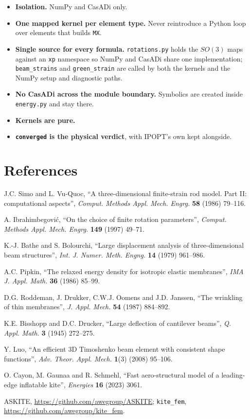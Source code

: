 \documentclass[11pt,a4paper]{article}
\newcommand{\code}[1]{\texttt{\small #1}}
\begin{document}
\begin{itemize}
\item \textbf{Isolation.} NumPy and CasADi only.
\item \textbf{One mapped kernel per element type.} Never reintroduce a Python
loop over elements that builds \code{MX}.
\item \textbf{Single source for every formula.} \code{rotations.py} holds the
$SO(3)$ maps against an \code{xp} namespace so NumPy and CasADi share one
implementation; \code{beam\_strains} and \code{green\_strain} are called by both
the kernels and the NumPy setup and diagnostic paths.
\item \textbf{No CasADi across the module boundary.} Symbolics are created inside
\code{energy.py} and stay there.
\item \textbf{Kernels are pure.}
\item \textbf{\code{converged} is the physical verdict}, with IPOPT's own kept
alongside.
\end{itemize}

\section*{References}

\begin{enumerate}[label={[\arabic*]}]
\item J.C. Simo and L. Vu-Quoc, ``A three-dimensional finite-strain rod model.
Part II: computational aspects'', \emph{Comput. Methods Appl. Mech. Engrg.}
\textbf{58} (1986) 79--116.
\item A. Ibrahimbegovi\'c, ``On the choice of finite rotation parameters'',
\emph{Comput. Methods Appl. Mech. Engrg.} \textbf{149} (1997) 49--71.
\item K.-J. Bathe and S. Bolourchi, ``Large displacement analysis of
three-dimensional beam structures'', \emph{Int. J. Numer. Meth. Engng.}
\textbf{14} (1979) 961--986.
\item A.C. Pipkin, ``The relaxed energy density for isotropic elastic
membranes'', \emph{IMA J. Appl. Math.} \textbf{36} (1986) 85--99.
\item D.G. Roddeman, J. Drukker, C.W.J. Oomens and J.D. Janssen, ``The wrinkling
of thin membranes'', \emph{J. Appl. Mech.} \textbf{54} (1987) 884--892.
\item K.E. Bisshopp and D.C. Drucker, ``Large deflection of cantilever beams'',
\emph{Q. Appl. Math.} \textbf{3} (1945) 272--275.
\item Y. Luo, ``An efficient 3D Timoshenko beam element with consistent shape
functions'', \emph{Adv. Theor. Appl. Mech.} \textbf{1}(3) (2008) 95--106.
\item O. Cayon, M. Gaunaa and R. Schmehl, ``Fast aero-structural model of a
leading-edge inflatable kite'', \emph{Energies} \textbf{16} (2023) 3061.
\item ASKITE, \url{https://github.com/awegroup/ASKITE};
\code{kite\_fem}, \url{https://github.com/awegroup/kite_fem}.
\end{enumerate}
\end{document}
